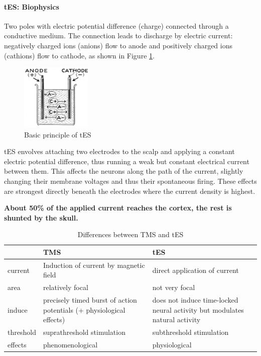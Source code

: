 \documentclass[12pt,article,oneside,a4paper]{memoir}
\begin{document}
\paragraph{tES: Biophysics} Two poles with electric potential difference (charge) connected through a conductive medium. The connection leads to discharge by electric current: negatively charged ions (anions) flow to anode and positively charged ions (cathions) flow to cathode, as shown in Figure \ref{fig:tes}. 

\begin{figure}
  \centering
  \includegraphics[width=0.3\textwidth]{imgs/tes.png}
  \caption{Basic principle of tES}
  \label{fig:tes}
\end{figure}

tES envolves attaching two electrodes to the scalp and applying a constant electric potential difference, thus running a weak but constant electrical current between them. This affects the neurons along the path of the current, slightly changing their membrane voltages and thus their spontaneous firing. These effects are strongest directly beneath the electrodes where the current density is highest.

\textbf{About 50\% of the applied current reaches the cortex, the rest is shunted by the skull.}

\begin{table}[h]
  \begin{tabular}{ l |  p{6cm} |  p{6cm} }
    \hline
     & TMS & tES \\ \hline
    current & Induction of current by magnetic field & direct application of current \\ \hline
    area & relatively focal & not very focal \\ \hline
    induce & precisely timed burst of action potentials (+ physiological effects) & does not induce time-locked neural activity but modulates natural activity \\ \hline
	threshold & suprathreshold stimulation & subthreshold stimulation \\ \hline
    effects & phenomenological & physiological \\
    \hline
  \end{tabular}
  \caption{Differences between TMS and tES}
\end{table}
\end{document}
